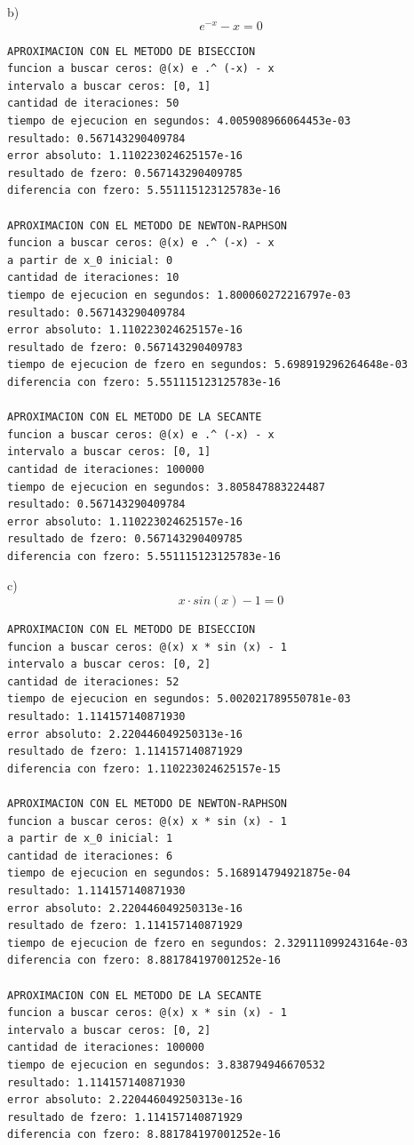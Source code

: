 \documentclass{article}
\begin{document}
b)
\[ e^{-x} - x = 0\]
\begin{lstlisting}
APROXIMACION CON EL METODO DE BISECCION
funcion a buscar ceros: @(x) e .^ (-x) - x
intervalo a buscar ceros: [0, 1]
cantidad de iteraciones: 50
tiempo de ejecucion en segundos: 4.005908966064453e-03
resultado: 0.567143290409784
error absoluto: 1.110223024625157e-16
resultado de fzero: 0.567143290409785
diferencia con fzero: 5.551115123125783e-16

APROXIMACION CON EL METODO DE NEWTON-RAPHSON
funcion a buscar ceros: @(x) e .^ (-x) - x
a partir de x_0 inicial: 0
cantidad de iteraciones: 10
tiempo de ejecucion en segundos: 1.800060272216797e-03
resultado: 0.567143290409784
error absoluto: 1.110223024625157e-16
resultado de fzero: 0.567143290409783
tiempo de ejecucion de fzero en segundos: 5.698919296264648e-03
diferencia con fzero: 5.551115123125783e-16

APROXIMACION CON EL METODO DE LA SECANTE
funcion a buscar ceros: @(x) e .^ (-x) - x
intervalo a buscar ceros: [0, 1]
cantidad de iteraciones: 100000
tiempo de ejecucion en segundos: 3.805847883224487
resultado: 0.567143290409784
error absoluto: 1.110223024625157e-16
resultado de fzero: 0.567143290409785
diferencia con fzero: 5.551115123125783e-16
\end{lstlisting}

c)
\[ x \cdot sin(x) - 1 = 0\]
\begin{lstlisting}
APROXIMACION CON EL METODO DE BISECCION
funcion a buscar ceros: @(x) x * sin (x) - 1
intervalo a buscar ceros: [0, 2]
cantidad de iteraciones: 52
tiempo de ejecucion en segundos: 5.002021789550781e-03
resultado: 1.114157140871930
error absoluto: 2.220446049250313e-16
resultado de fzero: 1.114157140871929
diferencia con fzero: 1.110223024625157e-15   

APROXIMACION CON EL METODO DE NEWTON-RAPHSON
funcion a buscar ceros: @(x) x * sin (x) - 1
a partir de x_0 inicial: 1
cantidad de iteraciones: 6
tiempo de ejecucion en segundos: 5.168914794921875e-04
resultado: 1.114157140871930
error absoluto: 2.220446049250313e-16
resultado de fzero: 1.114157140871929
tiempo de ejecucion de fzero en segundos: 2.329111099243164e-03
diferencia con fzero: 8.881784197001252e-16

APROXIMACION CON EL METODO DE LA SECANTE
funcion a buscar ceros: @(x) x * sin (x) - 1
intervalo a buscar ceros: [0, 2]
cantidad de iteraciones: 100000
tiempo de ejecucion en segundos: 3.838794946670532
resultado: 1.114157140871930
error absoluto: 2.220446049250313e-16
resultado de fzero: 1.114157140871929
diferencia con fzero: 8.881784197001252e-16
\end{lstlisting}
\end{document}
